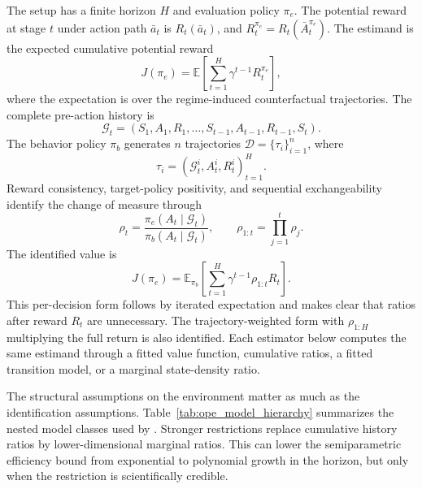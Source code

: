 The setup has a finite horizon $H$ and evaluation policy $\pi_e$. The potential reward at stage $t$ under action path $\bar a_t$ is $R_t(\bar a_t)$, and $R_t^{\pi_e}=R_t(\bar A_t^{\pi_e})$. The estimand is the expected cumulative potential reward
\begin{equation}
J(\pi_e) = \mathbb{E}\!\left[\sum_{t=1}^{H} \gamma^{t-1} R_t^{\pi_e}\right],
\label{eq:ope_estimand}
\end{equation}
where the expectation is over the regime-induced counterfactual trajectories. The complete pre-action history is
\[
\mathcal G_t=(S_1,A_1,R_1,\ldots,S_{t-1},A_{t-1},R_{t-1},S_t).
\]
The behavior policy $\pi_b$ generates $n$ trajectories
$\mathcal D=\{\tau_i\}_{i=1}^n$, where
\[
\tau_i=(\mathcal G_t^i,A_t^i,R_t^i)_{t=1}^H.
\]
Reward consistency, target-policy positivity, and sequential exchangeability identify the change of measure through
\[
\rho_t
=\frac{\pi_e(A_t\mid\mathcal G_t)}
{\pi_b(A_t\mid\mathcal G_t)},
\qquad
\rho_{1:t}=\prod_{j=1}^{t}\rho_j.
\]
The identified value is
\begin{equation}
J(\pi_e)
=\mathbb{E}_{\pi_b}\!\left[
\sum_{t=1}^{H}\gamma^{t-1}\rho_{1:t}R_t
\right].
\label{eq:ope_identification}
\end{equation}
This per-decision form follows by iterated expectation and makes clear that ratios after reward $R_t$ are unnecessary. The trajectory-weighted form with $\rho_{1:H}$ multiplying the full return is also identified. Each estimator below computes the same estimand through a fitted value function, cumulative ratios, a fitted transition model, or a marginal state-density ratio.

The structural assumptions on the environment matter as much as the identification assumptions. Table~\ref{tab:ope_model_hierarchy} summarizes the nested model classes used by \citet{ueharaShiKallus2022ope}. Stronger restrictions replace cumulative history ratios by lower-dimensional marginal ratios. This can lower the semiparametric efficiency bound from exponential to polynomial growth in the horizon, but only when the restriction is scientifically credible.

